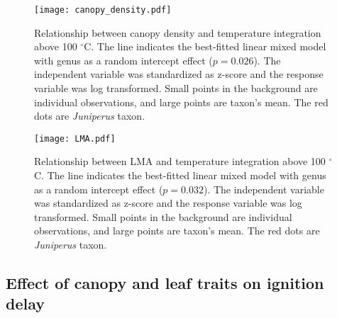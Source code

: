 \documentclass{ttuthes2007}
\begin{document}
\begin{figure}[ht]
    \centering
    \texttt{[image: canopy\_density.pdf]}
    \caption[short version]{\label{fig:canopyden-tempint} Relationship between canopy density and temperature integration above 100 $^{\circ}$C. The line indicates the best-fitted linear mixed model with genus as a random intercept effect ($p = 0.026$). The independent variable was standardized  as z-score and the response variable was log transformed. Small points in the background are individual observations, and large points are taxon's mean. The red dots are \emph{Juniperus} taxon.}
\end{figure}

\begin{figure}[ht]
    \centering
    \texttt{[image: LMA.pdf]}
    \caption[short version]{\label{fig:LMA-tempint} Relationship between LMA and temperature integration above 100 $^{\circ}$C. The line indicates the best-fitted linear mixed model with genus as a random intercept effect ($p = 0.032$). The independent variable was standardized  as z-score and the response variable was log transformed. Small points in the background are individual observations, and large points are taxon's mean. The red dots are \emph{Juniperus} taxon.}
\end{figure}



\clearpage
\subsection{Effect of canopy and leaf traits on ignition delay}


\end{document}
